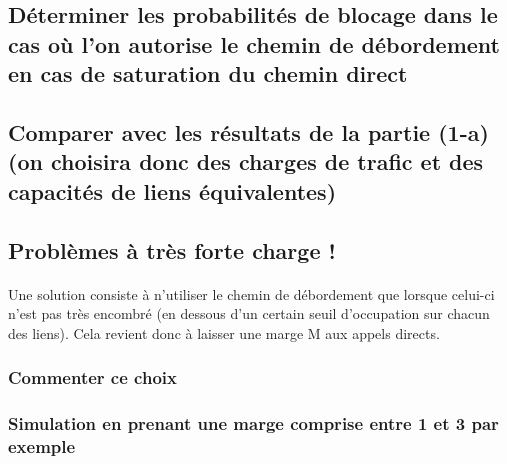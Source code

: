         \subsection{Déterminer les probabilités de blocage dans le cas où l'on autorise le chemin de débordement en cas de saturation du chemin direct}
%
        \subsection{Comparer avec les résultats de la partie (1-a) (on choisira donc des charges de trafic et des capacités de liens équivalentes)}
%
        \subsection{Problèmes à très forte charge !}
            \paragraph{}
Une solution consiste à n'utiliser le chemin de débordement que lorsque celui-ci n'est pas très encombré (en dessous d'un certain seuil d'occupation sur chacun des liens).
Cela revient donc à laisser une marge M aux appels directs.
%
            \subsubsection{Commenter ce choix}
%
            \subsubsection{Simulation en prenant une marge comprise entre 1 et 3 par exemple}
%
    \clearpage
%
